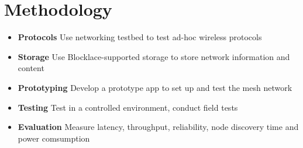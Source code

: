 \section{Methodology}
\begin{frame}
    \begin{itemize}
        \item \textbf{Protocols} Use networking testbed to test ad-hoc wireless protocols
        \item \textbf{Storage} Use Blocklace-supported storage to store network information and content
        \item \textbf{Prototyping} Develop a prototype app to set up and test the mesh network
        \item \textbf{Testing} Test in a controlled environment, conduct field tests
        \item \textbf{Evaluation} Measure latency, throughput, reliability, node discovery time and power comsumption
    \end{itemize}
\end{frame}